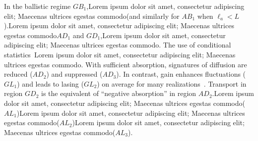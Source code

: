 In the ballistic regime $GB_1$,Lorem ipsum dolor sit amet, consectetur adipiscing elit; Maecenas ultrices egestas commodo(and similarly for $AB_1$ when $\ell_a < L$).Lorem ipsum dolor sit amet, consectetur adipiscing elit; Maecenas ultrices egestas commodo$AD_1$ and $GD_1$,Lorem ipsum dolor sit amet, consectetur adipiscing elit; Maecenas ultrices egestas commodo. The use of conditional statistics~\cite{2005_Yamilov_correlations}Lorem ipsum dolor sit amet, consectetur adipiscing elit; Maecenas ultrices egestas commodo. With sufficient absorption, signatures of diffusion are reduced ($AD_2$) and suppressed ($AD_3$). In contrast, gain enhances fluctuations ($GL_1$) and leads to lasing ($GL_2$) on average for many realizations~\cite{1968_Letokhov}. Transport in region $GD_2$ is the equivalent of ``negative absorption'' in region $AD_2$.Lorem ipsum dolor sit amet, consectetur adipiscing elit; Maecenas ultrices egestas commodo($AL_1$)Lorem ipsum dolor sit amet, consectetur adipiscing elit; Maecenas ultrices egestas commodo($AL_2$)Lorem ipsum dolor sit amet, consectetur adipiscing elit; Maecenas ultrices egestas commodo($AL_3$).


